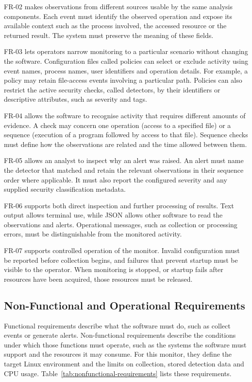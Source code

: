   FR-02 makes observations from different sources usable by the same analysis
  components. Each event must identify the observed operation and expose its
  available context such as the process involved, the accessed
  resource or the returned result. The system must preserve the meaning of
  these fields.

  FR-03 lets operators narrow monitoring to a particular scenario without
  changing the software. Configuration files called policies can select or
  exclude activity using event names, process names, user identifiers and
  operation details. For example, a policy may retain file-access events
  involving a particular path. Policies can also restrict the active security
  checks, called detectors, by their identifiers or descriptive attributes,
  such as severity and tags.

  FR-04 allows the software to recognise activity that requires different
  amounts of evidence. A check may concern one operation (access to a
  specified file) or a sequence (execution of a program followed by
  access to that file). Sequence checks must define how the observations are
  related and the time allowed between them.

  FR-05 allows an analyst to inspect why an alert was raised. An alert must
  name the detector that matched and retain the relevant observations in
  their sequence order where applicable. It must also report the configured
  severity and any supplied security classification metadata.

  FR-06 supports both direct inspection and further processing of results.
  Text output allows terminal use, while JSON allows other software to read
  the observations and alerts. Operational messages, such as collection or
  processing errors, must be distinguishable from the monitored activity.

  FR-07 supports controlled operation of the monitor. Invalid configuration
  must be reported before collection begins, and failures that prevent startup
  must be visible to the operator. When monitoring is stopped, or startup fails
  after resources have been acquired, those resources must be released.

\subsection{Non-Functional and Operational Requirements}
\label{subsec:nonfunctional-operational-requirements}

Functional requirements describe what the software must do, such as collect
events or generate alerts. Non-functional requirements describe the
conditions under which those functions must operate, such as the systems
the software must support and the resources it may consume.
For this monitor, they define the target Linux environment and the limits
on collection, stored detection data and CPU usage.
Table~\ref{tab:nonfunctional-requirements} lists these requirements.

